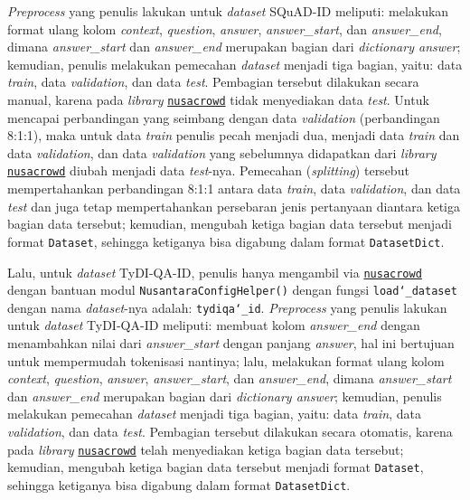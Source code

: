 \emph{Preprocess} yang penulis lakukan untuk \emph{dataset} SQuAD-ID meliputi: melakukan format ulang kolom \emph{context}, \emph{question}, \emph{answer}, \emph{answer\_start}, dan \emph{answer\_end}, dimana  \emph{answer\_start} dan \emph{answer\_end} merupakan bagian dari \emph{dictionary answer}; kemudian, penulis melakukan pemecahan \emph{dataset} menjadi tiga bagian, yaitu: data \emph{train}, data \emph{validation}, dan data \emph{test}. Pembagian tersebut dilakukan secara manual, karena pada \emph{library} \href{https://github.com/IndoNLP/nusa-crowd/tree/master/nusacrowd/nusa_datasets/}{\texttt{nusacrowd}} tidak menyediakan data \emph{test}. Untuk mencapai perbandingan yang seimbang dengan data \emph{validation} (perbandingan 8:1:1), maka untuk data \emph{train} penulis pecah menjadi dua, menjadi data \emph{train} dan data \emph{validation}, dan data \emph{validation} yang sebelumnya didapatkan dari \emph{library} \href{https://github.com/IndoNLP/nusa-crowd/tree/master/nusacrowd/nusa_datasets/}{\texttt{nusacrowd}} diubah menjadi data \emph{test}-nya. Pemecahan (\emph{splitting}) tersebut mempertahankan perbandingan 8:1:1 antara data \emph{train}, data \emph{validation}, dan data \emph{test} dan juga tetap mempertahankan persebaran jenis pertanyaan diantara ketiga bagian data tersebut; kemudian, mengubah ketiga bagian data tersebut menjadi format \texttt{Dataset}, sehingga ketiganya bisa digabung dalam format \texttt{DatasetDict}.

Lalu, untuk \emph{dataset} TyDI-QA-ID, penulis hanya mengambil via \href{https://github.com/IndoNLP/nusa-crowd/tree/master/nusacrowd/nusa_datasets/}{\texttt{nusacrowd}} dengan bantuan modul \texttt{NusantaraConfigHelper()} dengan fungsi \texttt{load\char`_dataset} dengan nama \emph{dataset}-nya adalah: \texttt{tydiqa\char`_id}. \emph{Preprocess} yang penulis lakukan untuk \emph{dataset} TyDI-QA-ID meliputi: membuat kolom \emph{answer\_end} dengan menambahkan nilai dari \emph{answer\_start} dengan panjang \emph{answer}, hal ini bertujuan untuk mempermudah tokenisasi nantinya; lalu, melakukan format ulang kolom \emph{context}, \emph{question}, \emph{answer}, \emph{answer\_start}, dan \emph{answer\_end}, dimana  \emph{answer\_start} dan \emph{answer\_end} merupakan bagian dari \emph{dictionary answer}; kemudian, penulis melakukan pemecahan \emph{dataset} menjadi tiga bagian, yaitu: data \emph{train}, data \emph{validation}, dan data \emph{test}. Pembagian tersebut dilakukan secara otomatis, karena pada \emph{library} \href{https://github.com/IndoNLP/nusa-crowd/tree/master/nusacrowd/nusa_datasets/}{\texttt{nusacrowd}} telah menyediakan ketiga bagian data tersebut; kemudian, mengubah ketiga bagian data tersebut menjadi format \texttt{Dataset}, sehingga ketiganya bisa digabung dalam format \texttt{DatasetDict}.

